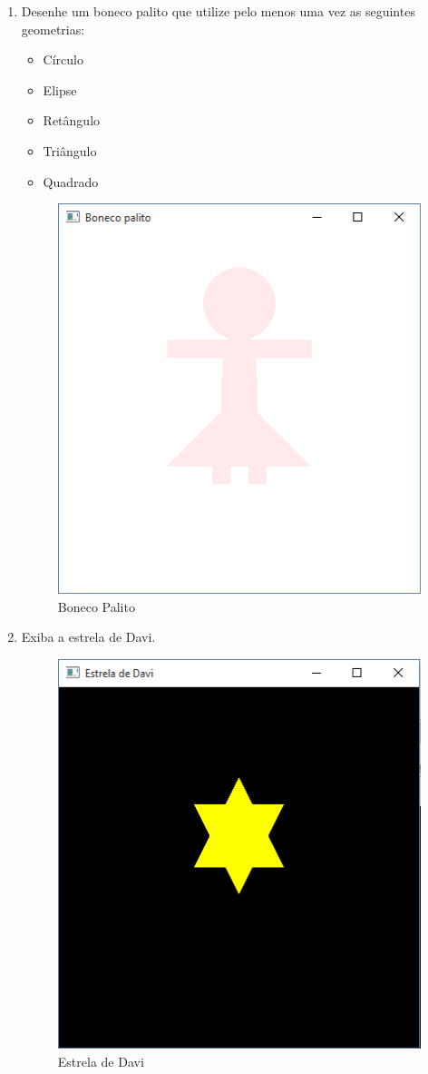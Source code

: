 \begin{enumerate}
\item
  Desenhe um boneco palito que utilize pelo menos uma vez as seguintes geometrias:
  \begin{itemize}
  \item
    Círculo
  \item
    Elipse
  \item
    Retângulo
  \item
    Triângulo
  \item
    Quadrado
  \end{itemize}
  \label{ex:cap01_ex2}

  \begin{figure}[H]
    \centerline{\includegraphics[width=.5\textwidth]{img/cap1_ex3.png}}
    \caption{Boneco Palito}
    \label{fig:cap01_ex2}
  \end{figure}

\item
  Exiba a estrela de Davi.
  \label{ex:cap01_ex3}

  \begin{figure}[H]
    \centerline{\includegraphics[width=.5\textwidth]{img/cap1_ex2.png}}
    \caption{Estrela de Davi}
    \label{fig:cap01_ex3}
  \end{figure}


\end{enumerate}
